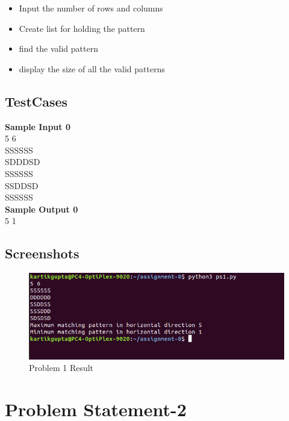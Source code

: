 \documentclass[12pt]{article}
\begin{document}
\begin{itemize}
\item Input the number of rows and columns 
\item Create list for holding the pattern
\item find the valid pattern  
\item display the size of all the valid patterns
\end{itemize}


\subsection{TestCases}
\textbf{Sample Input 0}\\
5 6\\
SSSSSS\\
SDDDSD\\
SSSSSS\\
SSDDSD\\
SSSSSS\\
\textbf{Sample Output 0}\\
5 1


\subsection{Screenshots}
\begin{figure}[h]
\begin{center}
\includegraphics[scale=.7]{ps1_result.png}
\caption{Problem 1 Result}
\end{center}
\end{figure}
\newpage




\section{Problem Statement-2}
\end{document}

